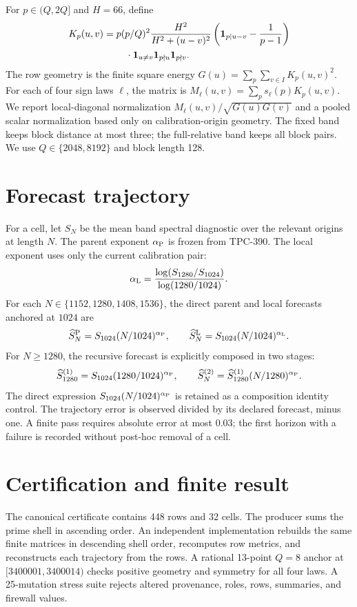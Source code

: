 \documentclass[10pt]{article}
\begin{document}
For $p\in(Q,2Q]$ and $H=66$, define
\begin{align*}
 K_p(u,v)={}&p(p/Q)^2\frac{H^2}{H^2+(u-v)^2}
 \left({\bf 1}_{p\mid u-v}-\frac{1}{p-1}\right)\\
 &\quad\cdot\mathbf{1}_{u\ne v}\mathbf{1}_{p\nmid u}\mathbf{1}_{p\nmid v}.
\end{align*}
The row geometry is the finite square energy
$G(u)=\sum_{p}\sum_{v\in I}K_p(u,v)^2$.  For each of four sign laws
$\ell$, the matrix is $M_\ell(u,v)=\sum_p s_\ell(p)K_p(u,v)$.  We report
local-diagonal normalization $M_\ell(u,v)/\sqrt{G(u)G(v)}$ and a pooled
scalar normalization based only on calibration-origin geometry.  The fixed
band keeps block distance at most three; the full-relative band keeps all
block pairs.  We use $Q\in\{2048,8192\}$ and block length 128.

\section{Forecast trajectory}

For a cell, let $S_N$ be the mean band spectral diagnostic over the relevant
origins at length $N$.  The parent exponent $\alpha_{\rm P}$ is frozen from
TPC-390.  The local exponent uses only the current calibration pair:
\[
 \alpha_{\rm L}=
 \frac{\log(S_{1280}/S_{1024})}{\log(1280/1024)}.
\]
For each $N\in\{1152,1280,1408,1536\}$, the direct parent and local forecasts
anchored at $1024$ are
\[
 \widehat S_{N}^{\rm P}
   =S_{1024}(N/1024)^{\alpha_{\rm P}},\qquad
 \widehat S_{N}^{\rm L}
   =S_{1024}(N/1024)^{\alpha_{\rm L}}.
\]
For $N\geq1280$, the recursive forecast is explicitly composed in two stages:
\[
 \widehat S_{1280}^{(1)}=S_{1024}(1280/1024)^{\alpha_{\rm P}},\qquad
 \widehat S_{N}^{(2)}=
 \widehat S_{1280}^{(1)}(N/1280)^{\alpha_{\rm P}}.
\]
The direct expression $S_{1024}(N/1024)^{\alpha_{\rm P}}$ is retained as a
composition identity control.  The trajectory error is observed divided by
its declared forecast, minus one.  A finite pass requires absolute error at
most $0.03$; the first horizon with a failure is recorded without post-hoc
removal of a cell.

\section{Certification and finite result}

The canonical certificate contains 448 rows and 32 cells.  The producer sums
the prime shell in ascending order.  An independent implementation rebuilds
the same finite matrices in descending shell order, recomputes row metrics,
and reconstructs each trajectory from the rows.  A rational 13-point
$Q=8$ anchor at $[3400001,3400014)$ checks positive geometry and symmetry for
all four laws.  A 25-mutation stress suite rejects altered provenance, roles,
rows, summaries, and firewall values.
\end{document}

